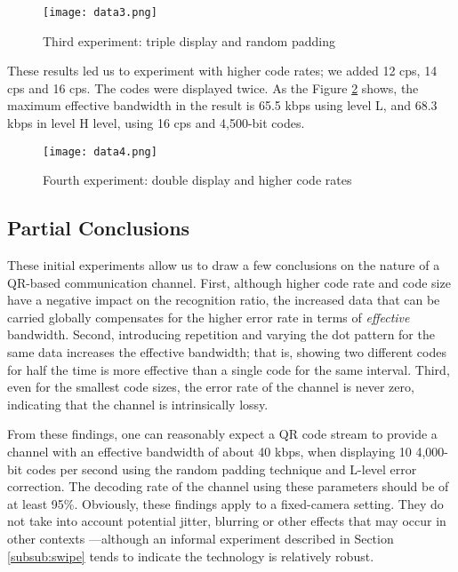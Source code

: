 \begin{figure}[ht]
\begin{center}
\centering
\texttt{[image: data3.png]}
\caption{Third experiment: triple display and random padding}
\label{img-exp3}
\end{center}
\end{figure}

These results led us to experiment with higher code rates; we added 12 cps, 14 cps and 16 cps. The codes were displayed twice. As the Figure \ref{img-exp4} shows, the maximum effective bandwidth in the result is 65.5 kbps using level L, and 68.3 kbps in level H level, using 16 cps and 4,500-bit codes.

\begin{figure}[ht]
\begin{center}
\centering
\texttt{[image: data4.png]}
\caption{Fourth experiment: double display and higher code rates}
\label{img-exp4}
\end{center}
\end{figure}

\subsection{Partial Conclusions}

These initial experiments allow us to draw a few conclusions on the nature of a QR-based communication channel. First, although higher code rate and code size have a negative impact on the recognition ratio, the increased data that can be carried globally compensates for the higher error rate in terms of \emph{effective} bandwidth. Second, introducing repetition and varying the dot pattern for the same data increases the effective bandwidth; that is, showing two different codes for half the time is more effective than a single code for the same interval. Third, even for the smallest code sizes, the error rate of the channel is never zero, indicating that the channel is intrinsically lossy. 

From these findings, one can reasonably expect a QR code stream to provide a channel with an effective bandwidth of about 40 kbps, when displaying 10 4,000-bit codes per second using the random padding technique and L-level error correction. The decoding rate of the channel using these parameters should be of at least 95\%. Obviously, these findings apply to a fixed-camera setting. They do not take into account potential jitter, blurring or other effects that may occur in other contexts ---although an informal experiment described in Section \ref{subsub:swipe} tends to indicate the technology is relatively robust.

